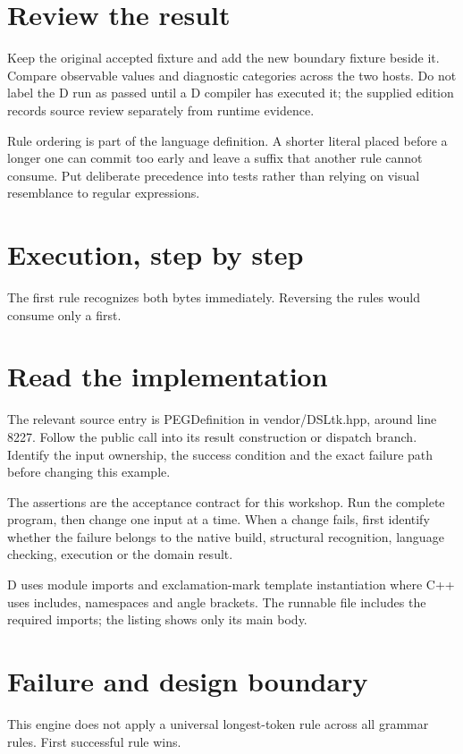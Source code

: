 \section*{Review the result}
Keep the original accepted fixture and add the new boundary fixture beside it. Compare observable values and diagnostic categories across the two hosts. Do not label the D run as passed until a D compiler has executed it; the supplied edition records source review separately from runtime evidence.

\clearpage
{}
Rule ordering is part of the language definition. A shorter literal placed before a longer one can commit too early and leave a suffix that another rule cannot consume. Put deliberate precedence into tests rather than relying on visual resemblance to regular expressions.


\section*{Execution, step by step}
The first rule recognizes both bytes immediately. Reversing the rules would consume only a first.

\section*{Read the implementation}
The relevant source entry is PEGDefinition in vendor/DSLtk.hpp, around line 8227. Follow the public call into its result construction or dispatch branch. Identify the input ownership, the success condition and the exact failure path before changing this example.

The assertions are the acceptance contract for this workshop. Run the complete program, then change one input at a time. When a change fails, first identify whether the failure belongs to the native build, structural recognition, language checking, execution or the domain result.

\clearpage
{}
D uses module imports and exclamation-mark template instantiation where C++ uses includes, namespaces and angle brackets. The runnable file includes the required imports; the listing shows only its main body.


\section*{Failure and design boundary}
This engine does not apply a universal longest-token rule across all grammar rules. First successful rule wins.

